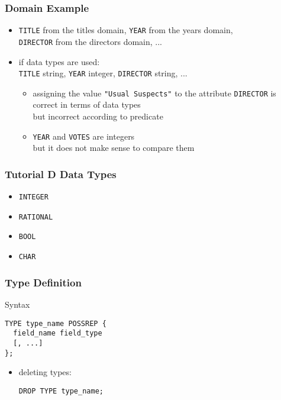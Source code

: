 \documentclass[dvipsnames]{beamer}
\theoremstyle{plain}
\begin{document}
\begin{frame}
  \frametitle{Domain Example}

  \begin{example}
    \begin{itemize}
      \item \texttt{TITLE} from the titles domain, \texttt{YEAR} from the years
        domain,\\
       \texttt{DIRECTOR} from the directors domain, ...

      \pause
      \item if data types are used:\\
        \texttt{TITLE} string, \texttt{YEAR} integer, \texttt{DIRECTOR} string,
          ...

      \begin{itemize}
        \item assigning the value \texttt{"Usual Suspects"} to the attribute
          \texttt{DIRECTOR} is correct in terms of data types\\
          but incorrect according to predicate

        \item \texttt{YEAR} and \texttt{VOTES} are integers\\
          but it does not make sense to compare them
      \end{itemize}
    \end{itemize}
  \end{example}
\end{frame}

\begin{frame}
  \frametitle{Tutorial D Data Types}

  \begin{itemize}
    \item \texttt{INTEGER}
    \item \texttt{RATIONAL}
    \item \texttt{BOOL}
    \item \texttt{CHAR}
  \end{itemize}
\end{frame}

\begin{frame}[fragile]
  \frametitle{Type Definition}

  \begin{block}{Syntax}
    \begin{lstlisting}
TYPE type_name POSSREP {
  field_name field_type
  [, ...]
};
    \end{lstlisting}
  \end{block}

  \pause
  \begin{itemize}
    \item deleting types:
      \begin{lstlisting}
DROP TYPE type_name;
      \end{lstlisting}
  \end{itemize}
\end{frame}
\end{document}
